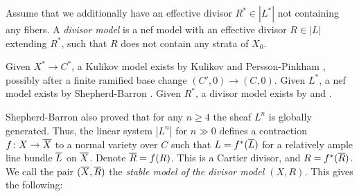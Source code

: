 \documentclass[table,x11names]{amsart}
\begin{document}
\begin{definition}
  Assume that we additionally have an effective divisor
  $R^*\in |L^*|$ not containing any fibers.  A \emph{divisor model} is a
  nef model with an effective divisor $R\in |L|$ extending
  $R^*$, such that $R$ does not contain any strata of $X_0$.
\end{definition}

Given $X^*\to C^*$, a Kulikov model exists by Kulikov
\cite{kulikov1977degenerations-of-k3-surfaces} and Persson-Pinkham
\cite{persson1981degeneration-of-surfaces}, possibly after a finite
ramified base change $(C',0)\to (C,0)$. Given $L^*$, a nef model
exists by Shepherd-Barron
\cite{shepherd-barron1981extending-polarizations}. Given $R^*$, a
divisor model exists by \cite[Thm.2.11,
Rem.2.12]{laza2016ksba-compactification} and \cite[Claim
3.13]{alexeev2019stable-pair}.

Shepherd-Barron also proved that for any $n\ge4$ the sheaf $L^n$
is globally generated.  Thus, the linear system $|L^n|$ for $n\gg0$
defines a contraction $f\colon X\to {\overline X}$ to a normal variety over
$C$ such that $L = f^*({\overline L})$ for a relatively ample line bundle
${\overline L}$ on ${\overline X}$.  Denote ${\overline R} = f(R)$. This is a
Cartier divisor, and $R = f^*({\overline R})$. We call the pair $({\overline X},
{\overline R})$ the \emph{stable model of the divisor model $(X,R)$.}
This gives the following:
\end{document}
